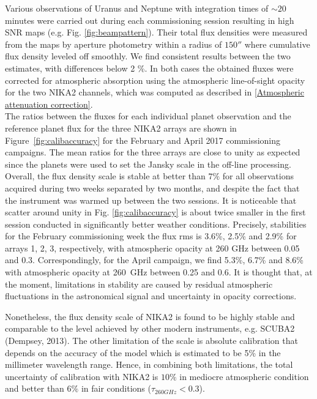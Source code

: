 \documentclass[]{aa} %
\begin{document}
Various observations of Uranus and Neptune with integration times of $\sim 20$ minutes were carried out during each commissioning session resulting in high SNR maps (e.g. Fig. \ref{fig:beampattern}). Their total flux densities were measured from the maps 
by aperture photometry within a radius of  $150''$ where cumulative flux density leveled off smoothly. We find consistent results between the two estimates, with differences below 2 \%. In both cases the obtained fluxes were corrected for atmospheric absorption using the atmospheric line-of-sight opacity for the two NIKA2 channels, which was computed as described in \ref{Atmospheric attenuation correction}. \\

The ratios between the fluxes for each individual planet observation and the reference planet flux for the three NIKA2 arrays are shown in Figure~\ref{fig:calibaccuracy} for the February and April 2017 commissioning campaigns.  The mean ratios for the three arrays are close to unity as expected since the planets were used to set the Jansky scale in the off-line processing. Overall, the flux density scale is stable at better than $7\%$ for all observations acquired during two weeks  separated by two months, and despite the fact that the instrument was warmed up between the two sessions. It is noticeable that scatter around unity in Fig. \ref{fig:calibaccuracy}
is about twice smaller in the first session conducted in significantly better weather conditions.
Precisely, stabilities for the February commissioning week the flux rms is 3.6\%, 2.5\% and 2.9\% for arrays 1, 2, 3, respectively, with atmospheric opacity at 260 GHz between 0.05 and 0.3.
Correspondingly, for the April campaign, we find  5.3\%, 6.7\% and 8.6\%  with atmospheric opacity at 260~GHz between 0.25 and 0.6. It is thought that, at the moment, limitations in stability are caused by residual atmospheric fluctuations in the astronomical signal and uncertainty in opacity corrections. 

Nonetheless, the flux density scale of NIKA2 is found to be highly stable and comparable to the level achieved
by other modern instruments, e.g. SCUBA2 (Dempsey, 2013). The other limitation of the scale is absolute calibration that depends on the accuracy of the \cite{moreno2010} model which is estimated to be 5\% in the millimeter wavelength range. Hence, in combining both limitations, the total uncertainty of calibration with NIKA2 is $10\%$ in mediocre atmospheric condition and better than $6\%$ in fair conditions ($\tau_{260 GHz} <0.3$). 
\end{document}

